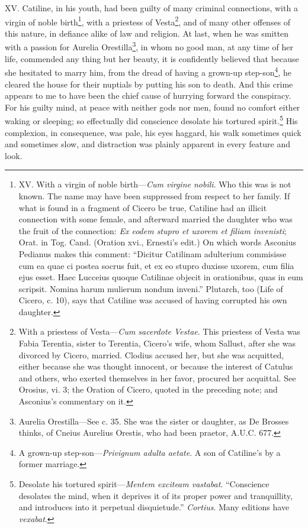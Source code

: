 XV. Catiline, in his youth, had been guilty of many criminal
connections, with a virgin of noble birth\footnote{XV. With a virgin of noble birth—\emph{Cum virgine nobili}. Who
this was is not known. The name may have been suppressed from respect
to her family. If what is found in a fragment of Cicero be true,
Catiline had an illicit connection with some female, and afterward
married the daughter who was the fruit of the connection: \emph{Ex eodem
stupro et uxorem et filiam invenisti}; Orat. in Tog. Cand. (Oration
xvi., Ernesti's edit.) On which words Asconius Pedianus makes this
comment: ``Dicitur Catilinam adulterium commisisse cum ea quae ci
postea socrus fuit, et ex eo stupro duxisse uxorem, cum filia ejus
esset. Haec Lucceius quoque Catilinae objecit in orationibus, quas in
eum scripsit. Nomina harum mulierum nondum inveni.'' Plutarch, too
(Life of Cicero, c. 10), says that Catiline was accused of having
corrupted his own daughter.}, with a priestess of
Vesta\footnote{With a priestess of Vesta—\emph{Cum sacerdote Vestae}. This
priestess of Vesta was Fabia Terentia, sister to Terentia, Cicero's
wife, whom Sallust, after she was divorced by Cicero, married. Clodius
accused her, but she was acquitted, either because she was thought
innocent, or because the interest of Catulus and others, who exerted
themselves in her favor, procured her acquittal. See Orosius, vi. 3;
the Oration of Cicero, quoted in the preceding note; and Asconius's
commentary on it.}, and of many other offenses of this nature, in defiance
alike of law and religion. At last, when he was smitten with a passion
for Aurelia Orestilla\footnote{Aurelia Orestilla—See c. 35. She was the sister or daughter,
as De Brosses thinks, of Cneius Aurelius Orestis, who had been praetor,
A.U.C. 677.}, in whom no good man, at any time of her
life, commended any thing but her beauty, it is confidently believed
that because she hesitated to marry him, from the dread of having a
grown-up step-son\footnote{A grown-up step-son—\emph{Privignum adulta aetate}. A son of
Catiline's by a former marriage.}, he cleared the house for their nuptials by
putting his son to death. And this crime appears to me to have been
the chief cause of hurrying forward the conspiracy. For his guilty
mind, at peace with neither gods nor men, found no comfort either
waking or sleeping; so effectually did conscience desolate his
tortured spirit.\footnote{Desolate his tortured spirit—\emph{Mentem exciteam vastabat}.
``Conscience desolates the mind, when it deprives it of its proper
power and tranquillity, and introduces into it perpetual disquietude.''
\emph{Cortius}. Many editions have \emph{vexabat}.} His complexion, in consequence, was pale, his
eyes haggard, his walk sometimes quick and sometimes slow, and
distraction was plainly apparent in every feature and look.

